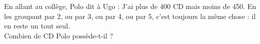 
En allant au collège, Polo dit à Ugo : \og{} J'ai plus de 400 CD mais moins de 450. En les groupant par 2, ou par 3, ou par 4, ou par 5, c'est toujours la même chose : il en reste un tout seul.\fg
\\Combien de CD Polo possède-t-il ?
